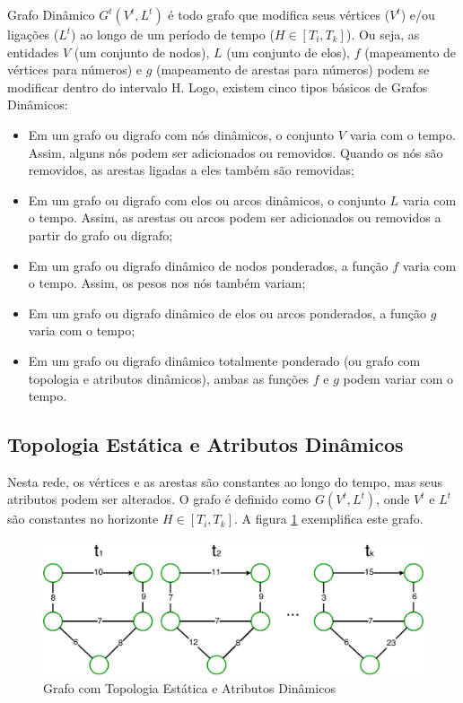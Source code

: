Grafo Dinâmico $G^t(V^t, L^t)$ é todo grafo que modifica seus vértices ($V^t$) e/ou ligações ($L^t$)
ao longo de um período de tempo ($H \in [T_i, T_k]$). Ou seja, as entidades $V$ (um conjunto de nodos),
$L$ (um conjunto de elos), $f$ (mapeamento de vértices para números) e $g$ (mapeamento de arestas para números)
podem se modificar dentro do intervalo H.
Logo, existem cinco tipos básicos de Grafos Dinâmicos:

\begin{itemize}
\item Em um grafo ou digrafo com nós dinâmicos, o conjunto $V$ varia com o tempo. Assim, alguns nós podem
ser adicionados ou removidos. Quando os nós são removidos, as arestas ligadas a eles também são removidas; 
\item Em um grafo ou digrafo com elos ou arcos dinâmicos, o conjunto $L$ varia com o tempo. Assim, as arestas ou arcos podem
ser adicionados ou removidos a partir do grafo ou digrafo;
\item Em um grafo ou digrafo dinâmico de nodos ponderados, a função $f$ varia com o tempo. Assim, os pesos nos nós também variam;
\item Em um grafo ou digrafo dinâmico de elos ou arcos ponderados, a função $g$ varia com o tempo;
\item Em um grafo ou digrafo dinâmico totalmente ponderado (ou grafo com topologia e atributos dinâmicos), ambas as funções $f$ e $g$
podem variar com o tempo.
\end{itemize}

\subsection{Topologia Estática e Atributos Dinâmicos}
Nesta rede, os vértices e as arestas são constantes ao longo do tempo, mas seus atributos podem ser alterados.
O grafo é definido como $G(V^t, L^t)$, onde $V^t$ e $L^t$ são constantes no horizonte $H \in [T_i, T_k]$.
A figura \ref{fig:tead} exemplifica este grafo.

\begin{figure}[htbp]
\centering
 \includegraphics[width=.80\textwidth]{chapters/fig/tead.png}
\caption{Grafo com Topologia Estática e Atributos Dinâmicos}
\label{fig:tead}
\end{figure}

